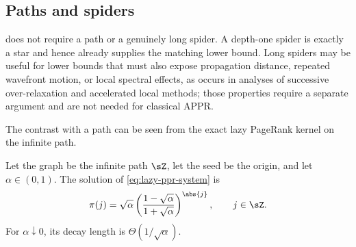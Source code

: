 \subsection{Paths and spiders}
\label{subsec:appr-paths-and-spiders}

 does not require a path or a genuinely long
spider. A depth-one spider is exactly a star and hence already supplies the
matching lower bound. Long spiders may be useful for lower bounds that must
also expose propagation distance, repeated wavefront motion, or local spectral
effects, as occurs in analyses of successive over-relaxation and accelerated
local methods; those properties require a separate argument and are not needed
for classical APPR.

The contrast with a path can be seen from the exact lazy PageRank kernel on
the infinite path.

\begin{lemma}
\label{lem:lazy-path-kernel}
Let the graph be the infinite path \(\sZ\), let the seed be the origin, and let
\(\alpha\in(0,1)\). The solution of \cref{eq:lazy-ppr-system} is
\begin{equation}
    \pi(j)
    =\sqrt{\alpha}
     \left(\frac{1-\sqrt{\alpha}}{1+\sqrt{\alpha}}\right)^{\abs{j}},
    \qquad j\in\sZ.
    \label{eq:lazy-path-kernel}
\end{equation}
For \(\alpha\downarrow0\), its decay length is \(\Theta(1/\sqrt{\alpha})\).
\end{lemma}

